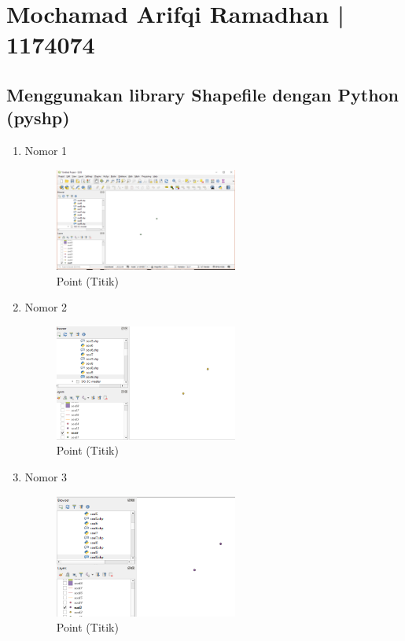 \section{Mochamad Arifqi Ramadhan | 1174074}
\subsection{Menggunakan library Shapefile dengan Python (pyshp)}
\begin{enumerate}
	\item Nomor 1
	
	\begin{figure}[H]
		\includegraphics[width=6cm]{figures/Tugas2/1174074/soal1.png}
		\centering
		\caption{Point (Titik)}
	\end{figure}
	\item Nomor 2
	
	\begin{figure}[H]
		\includegraphics[width=6cm]{figures/Tugas2/1174074/soal2.png}
		\centering
		\caption{Point (Titik)}
	\end{figure}
	\item Nomor 3
	
	\begin{figure}[H]
		\includegraphics[width=6cm]{figures/Tugas2/1174074/soal3.png}
		\centering
		\caption{Point (Titik)}
	\end{figure}

\end{enumerate}
